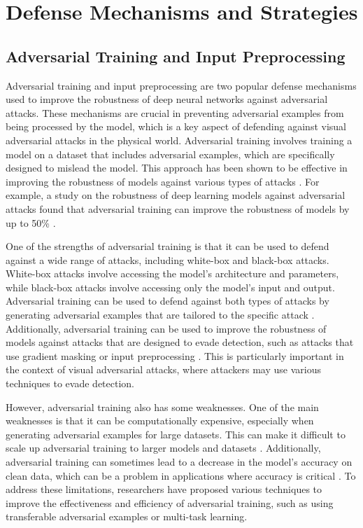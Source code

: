 \documentclass[11pt]{article}
\begin{document}
\section{Defense Mechanisms and Strategies}

\subsection{Adversarial Training and Input Preprocessing}

Adversarial training and input preprocessing are two popular defense mechanisms used to improve the robustness of deep neural networks against adversarial attacks. These mechanisms are crucial in preventing adversarial examples from being processed by the model, which is a key aspect of defending against visual adversarial attacks in the physical world. Adversarial training involves training a model on a dataset that includes adversarial examples, which are specifically designed to mislead the model. This approach has been shown to be effective in improving the robustness of models against various types of attacks \cite{ref81}. For example, a study on the robustness of deep learning models against adversarial attacks found that adversarial training can improve the robustness of models by up to 50\% \cite{ref82}.

One of the strengths of adversarial training is that it can be used to defend against a wide range of attacks, including white-box and black-box attacks. White-box attacks involve accessing the model's architecture and parameters, while black-box attacks involve accessing only the model's input and output. Adversarial training can be used to defend against both types of attacks by generating adversarial examples that are tailored to the specific attack \cite{ref43}. Additionally, adversarial training can be used to improve the robustness of models against attacks that are designed to evade detection, such as attacks that use gradient masking or input preprocessing \cite{ref8}. This is particularly important in the context of visual adversarial attacks, where attackers may use various techniques to evade detection.

However, adversarial training also has some weaknesses. One of the main weaknesses is that it can be computationally expensive, especially when generating adversarial examples for large datasets. This can make it difficult to scale up adversarial training to larger models and datasets \cite{ref83}. Additionally, adversarial training can sometimes lead to a decrease in the model's accuracy on clean data, which can be a problem in applications where accuracy is critical \cite{ref84}. To address these limitations, researchers have proposed various techniques to improve the effectiveness and efficiency of adversarial training, such as using transferable adversarial examples or multi-task learning.
\end{document}
